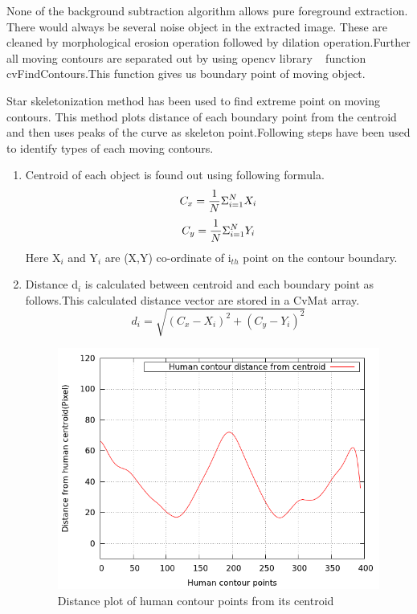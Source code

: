 None of the background subtraction algorithm allows pure foreground
extraction. There would always be several noise object in the extracted
image. These are cleaned by morphological erosion operation followed by
dilation operation.Further all moving contours are separated out by
using opencv library ~\cite{34} function cvFindContours.This function
gives us boundary point of moving object.

Star skeletonization method has been used to find extreme point on
moving contours. This method plots distance of each boundary point from
the centroid and then uses peaks of the curve as skeleton
point.Following steps have been used to identify types of each moving
contours.
\begin{enumerate}
\item Centroid of each object is found out using following formula.\\
	\begin{equation}
	C_x = {1 \over N} \Sigma ^N _{i = 1} X_i 
	\end{equation}
	\begin{equation}
	C_y = {1 \over N} \Sigma ^N _{i = 1} Y_i 
	\end{equation}
Here X$_i$ and Y$_i$ are (X,Y) co-ordinate of i$_{th}$ point on the contour
boundary.
\item Distance d$_i$ is calculated between centroid and each boundary
point as follows.This calculated distance vector are stored in a CvMat
array.
	\begin{equation}
	d_i = \sqrt{(C_x - X_i)^2 + (C_y - Y_i)^2}
	\end{equation}

\begin{figure}[!b]
\centering
\includegraphics[scale=0.60]{Figures/distance}
\caption{Distance plot of human contour points from its centroid}
\label{distance}
\end{figure}


\end{enumerate}
